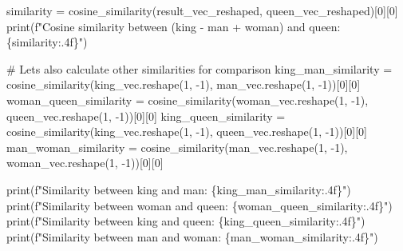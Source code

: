 \documentclass[
  letterpaper,
  DIV=11,
  numbers=noendperiod]{scrartcl}
\newenvironment{Shaded}{\begin{snugshade}}{\end{snugshade}}
\newcommand{\BuiltInTok}[1]{\textcolor[rgb]{0.00,0.23,0.31}{#1}}
\newcommand{\CommentTok}[1]{\textcolor[rgb]{0.37,0.37,0.37}{#1}}
\newcommand{\DecValTok}[1]{\textcolor[rgb]{0.68,0.00,0.00}{#1}}
\newcommand{\NormalTok}[1]{\textcolor[rgb]{0.00,0.23,0.31}{#1}}
\newcommand{\OperatorTok}[1]{\textcolor[rgb]{0.37,0.37,0.37}{#1}}
\newcommand{\SpecialCharTok}[1]{\textcolor[rgb]{0.37,0.37,0.37}{#1}}
\newcommand{\SpecialStringTok}[1]{\textcolor[rgb]{0.13,0.47,0.30}{#1}}
\begin{document}
\begin{Shaded}
\begin{Highlighting}[]
\NormalTok{similarity }\OperatorTok{=}\NormalTok{ cosine\_similarity(result\_vec\_reshaped, queen\_vec\_reshaped)[}\DecValTok{0}\NormalTok{][}\DecValTok{0}\NormalTok{]}
\BuiltInTok{print}\NormalTok{(}\SpecialStringTok{f"Cosine similarity between (king {-} man + woman) and queen: }\SpecialCharTok{\{}\NormalTok{similarity}\SpecialCharTok{:.4f\}}\SpecialStringTok{"}\NormalTok{)}

\CommentTok{\# Let\textquotesingle{}s also calculate other similarities for comparison}
\NormalTok{king\_man\_similarity }\OperatorTok{=}\NormalTok{ cosine\_similarity(king\_vec.reshape(}\DecValTok{1}\NormalTok{, }\OperatorTok{{-}}\DecValTok{1}\NormalTok{), man\_vec.reshape(}\DecValTok{1}\NormalTok{, }\OperatorTok{{-}}\DecValTok{1}\NormalTok{))[}\DecValTok{0}\NormalTok{][}\DecValTok{0}\NormalTok{]}
\NormalTok{woman\_queen\_similarity }\OperatorTok{=}\NormalTok{ cosine\_similarity(woman\_vec.reshape(}\DecValTok{1}\NormalTok{, }\OperatorTok{{-}}\DecValTok{1}\NormalTok{), queen\_vec.reshape(}\DecValTok{1}\NormalTok{, }\OperatorTok{{-}}\DecValTok{1}\NormalTok{))[}\DecValTok{0}\NormalTok{][}\DecValTok{0}\NormalTok{]}
\NormalTok{king\_queen\_similarity }\OperatorTok{=}\NormalTok{ cosine\_similarity(king\_vec.reshape(}\DecValTok{1}\NormalTok{, }\OperatorTok{{-}}\DecValTok{1}\NormalTok{), queen\_vec.reshape(}\DecValTok{1}\NormalTok{, }\OperatorTok{{-}}\DecValTok{1}\NormalTok{))[}\DecValTok{0}\NormalTok{][}\DecValTok{0}\NormalTok{]}
\NormalTok{man\_woman\_similarity }\OperatorTok{=}\NormalTok{ cosine\_similarity(man\_vec.reshape(}\DecValTok{1}\NormalTok{, }\OperatorTok{{-}}\DecValTok{1}\NormalTok{), woman\_vec.reshape(}\DecValTok{1}\NormalTok{, }\OperatorTok{{-}}\DecValTok{1}\NormalTok{))[}\DecValTok{0}\NormalTok{][}\DecValTok{0}\NormalTok{]}

\BuiltInTok{print}\NormalTok{(}\SpecialStringTok{f"Similarity between king and man: }\SpecialCharTok{\{}\NormalTok{king\_man\_similarity}\SpecialCharTok{:.4f\}}\SpecialStringTok{"}\NormalTok{)}
\BuiltInTok{print}\NormalTok{(}\SpecialStringTok{f"Similarity between woman and queen: }\SpecialCharTok{\{}\NormalTok{woman\_queen\_similarity}\SpecialCharTok{:.4f\}}\SpecialStringTok{"}\NormalTok{)}
\BuiltInTok{print}\NormalTok{(}\SpecialStringTok{f"Similarity between king and queen: }\SpecialCharTok{\{}\NormalTok{king\_queen\_similarity}\SpecialCharTok{:.4f\}}\SpecialStringTok{"}\NormalTok{)}
\BuiltInTok{print}\NormalTok{(}\SpecialStringTok{f"Similarity between man and woman: }\SpecialCharTok{\{}\NormalTok{man\_woman\_similarity}\SpecialCharTok{:.4f\}}\SpecialStringTok{"}\NormalTok{)}
\end{Highlighting}
\end{Shaded}
\end{document}
